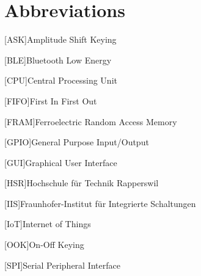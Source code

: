 \chapter*{Abbreviations}
\begin{acronym}
	[ASK]{Amplitude Shift Keying}
\end{acronym}

\begin{acronym}
	[BLE]{Bluetooth Low Energy}
\end{acronym}

\begin{acronym}
	[CPU]{Central Processing Unit}
\end{acronym}

\begin{acronym}
	[FIFO]{First In First Out}
\end{acronym}

\begin{acronym}
	[FRAM]{Ferroelectric Random Access Memory}
\end{acronym}

\begin{acronym}
	[GPIO]{General Purpose Input/Output}
\end{acronym}

\begin{acronym}
	[GUI]{Graphical User Interface}
\end{acronym}

\begin{acronym}
	[HSR]{Hochschule für Technik Rapperswil}
\end{acronym}

\begin{acronym}
	[IIS]{Fraunhofer-Institut für Integrierte Schaltungen}
\end{acronym}

\begin{acronym}
	[IoT]{Internet of Things}
\end{acronym}

\begin{acronym}
	[OOK]{On-Off Keying}
\end{acronym}

\begin{acronym}
	[SPI]{Serial Peripheral Interface}
\end{acronym}

